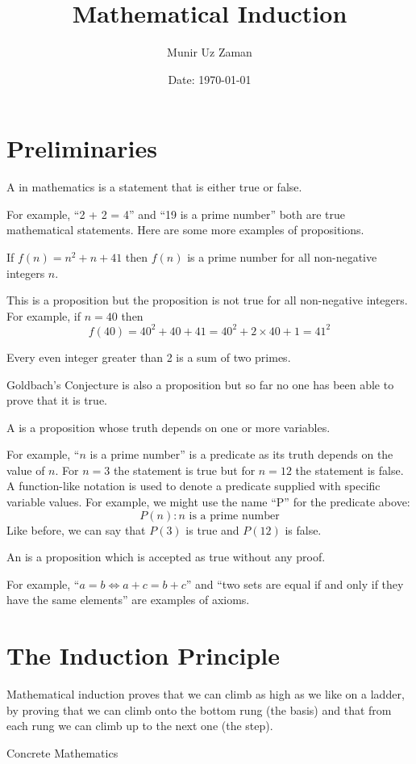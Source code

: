 \documentclass[11pt,numbers=noenddot,svgnames,dvipsnames]{scrartcl}
\title{Mathematical Induction}
\author{Munir Uz Zaman}
\date{Date: \today}
\begin{document}
\maketitle
\tableofcontents

\section{Preliminaries}
\begin{definition}
A  in mathematics is a statement that is either true or false.
\end{definition}
For example, ``2 + 2 = 4'' and ``19 is a prime number'' both are true mathematical statements. 
Here are some more examples of propositions.
\begin{proposition}
    If $f(n) = n^{2} + n + 41$ then $f(n)$ is a prime number for all non-negative integers $n$.
\end{proposition}
This is a proposition but the proposition is not true for all non-negative integers. 
For example, if $n=40$ then 
\[
    f(40) = 40^{2} + 40 + 41 = 40^{2} + 2\times 40 + 1 = 41^{2}
\]
\begin{proposition}
    Every even integer greater than 2 is a sum of two primes.
\end{proposition}
Goldbach's Conjecture is also a proposition but so far no one has been able to 
prove that it is true.

\begin{definition}
    A  is a proposition whose truth depends on one or more variables.
\end{definition}
For example, ``$n$ is a prime number'' is a predicate as its truth depends on the value of $n$. 
For $n=3$ the statement is true but for $n=12$ the statement is false. 
A function-like notation is used to denote a predicate supplied with specific variable values. 
For example, we might use the name ``P'' for the predicate above:
\[
P(n) : n\text{ is a prime number}
\]
Like before, we can say that $P(3)$ is true and $P(12)$ is false.

\begin{definition}
    An  is a proposition which is accepted as true without any proof.
\end{definition}
For example, ``$a = b \iff a + c = b + c$'' and ``two sets are equal if and only if they have the same elements'' are 
examples of axioms.

\section{The Induction Principle}
\epigraph{
Mathematical induction proves that we can climb as high
as we like on a ladder, by proving that we can climb onto
the bottom rung (the basis) and that from each rung we
can climb up to the next one (the step).}{Concrete Mathematics}
\end{document}
